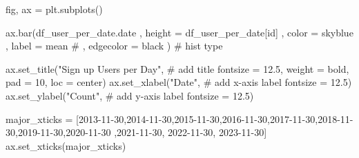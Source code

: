 \documentclass[
  letterpaper,
  DIV=11,
  numbers=noendperiod]{scrartcl}
\newenvironment{Shaded}{\begin{snugshade}}{\end{snugshade}}
\newcommand{\CommentTok}[1]{\textcolor[rgb]{0.37,0.37,0.37}{#1}}
\newcommand{\DecValTok}[1]{\textcolor[rgb]{0.68,0.00,0.00}{#1}}
\newcommand{\FloatTok}[1]{\textcolor[rgb]{0.68,0.00,0.00}{#1}}
\newcommand{\NormalTok}[1]{\textcolor[rgb]{0.00,0.23,0.31}{#1}}
\newcommand{\OperatorTok}[1]{\textcolor[rgb]{0.37,0.37,0.37}{#1}}
\newcommand{\StringTok}[1]{\textcolor[rgb]{0.13,0.47,0.30}{#1}}
\begin{document}
\begin{Shaded}
\begin{Highlighting}[]
\NormalTok{fig, ax }\OperatorTok{=}\NormalTok{ plt.subplots()}

\NormalTok{ax.bar(df\_user\_per\_date.date}
\NormalTok{    ,  height }\OperatorTok{=}\NormalTok{ df\_user\_per\_date[}\StringTok{\textquotesingle{}id\textquotesingle{}}\NormalTok{]}
\NormalTok{    ,  color }\OperatorTok{=} \StringTok{\textquotesingle{}skyblue\textquotesingle{}}
\NormalTok{    ,  label }\OperatorTok{=} \StringTok{\textquotesingle{}mean\textquotesingle{}}
    \CommentTok{\# ,  edgecolor = \textquotesingle{}black\textquotesingle{}}
\NormalTok{      ) }\CommentTok{\# hist type}

\NormalTok{ax.set\_title(}\StringTok{"Sign up Users per Day"}\NormalTok{, }\CommentTok{\# add title}
\NormalTok{             fontsize }\OperatorTok{=} \FloatTok{12.5}\NormalTok{,}
\NormalTok{             weight }\OperatorTok{=} \StringTok{\textquotesingle{}bold\textquotesingle{}}\NormalTok{,}
\NormalTok{             pad }\OperatorTok{=} \DecValTok{10}\NormalTok{,}
\NormalTok{             loc }\OperatorTok{=} \StringTok{\textquotesingle{}center\textquotesingle{}}\NormalTok{)}
\NormalTok{ax.set\_xlabel(}\StringTok{"Date"}\NormalTok{, }\CommentTok{\# add x{-}axis label}
\NormalTok{              fontsize }\OperatorTok{=} \FloatTok{12.5}\NormalTok{)}
\NormalTok{ax.set\_ylabel(}\StringTok{"Count"}\NormalTok{, }\CommentTok{\# add y{-}axis label}
\NormalTok{              fontsize }\OperatorTok{=} \FloatTok{12.5}\NormalTok{)}

\NormalTok{major\_xticks }\OperatorTok{=}\NormalTok{ [}\StringTok{\textquotesingle{}2013{-}11{-}30\textquotesingle{}}\NormalTok{,}\StringTok{\textquotesingle{}2014{-}11{-}30\textquotesingle{}}\NormalTok{,}\StringTok{\textquotesingle{}2015{-}11{-}30\textquotesingle{}}\NormalTok{,}\StringTok{\textquotesingle{}2016{-}11{-}30\textquotesingle{}}\NormalTok{,}\StringTok{\textquotesingle{}2017{-}11{-}30\textquotesingle{}}\NormalTok{,}\StringTok{\textquotesingle{}2018{-}11{-}30\textquotesingle{}}\NormalTok{,}\StringTok{\textquotesingle{}2019{-}11{-}30\textquotesingle{}}\NormalTok{,}\StringTok{\textquotesingle{}2020{-}11{-}30\textquotesingle{}}
\NormalTok{                ,}\StringTok{\textquotesingle{}2021{-}11{-}30\textquotesingle{}}\NormalTok{, }\StringTok{\textquotesingle{}2022{-}11{-}30\textquotesingle{}}\NormalTok{, }\StringTok{\textquotesingle{}2023{-}11{-}30\textquotesingle{}}\NormalTok{]}
\NormalTok{ax.set\_xticks(major\_xticks)}


\end{Highlighting}
\end{Shaded}
\end{document}
